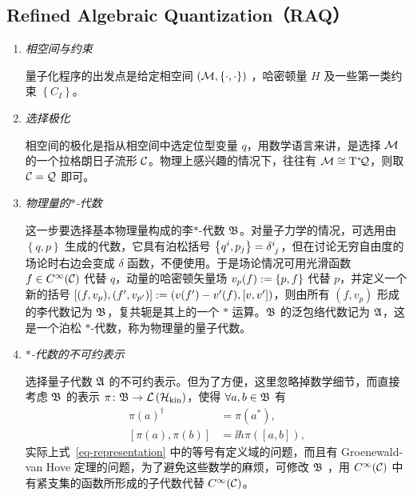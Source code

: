 		\subsection{Refined Algebraic Quantization（RAQ）}
		\begin{enumerate}
			\item \emph{相空间与约束}

					量子化程序的出发点是给定相空间 $\left( \mathcal{M}, \{\cdot, \cdot\} \right)$ ，哈密顿量 $H$ 及一些第一类约束 $\left\{ C_I \right\}$。

			\item \emph{选择极化}
			
					相空间的极化是指从相空间中选定位型变量 ${q}$，用数学语言来讲，是选择 $\mathcal{M}$ 的一个拉格朗日子流形 $\mathcal{C}$。物理上感兴趣的情况下，往往有 $\mathcal{M} \cong \mathrm{T}^*_{{}}\!{\mathcal{Q}}$，则取 $\mathcal{C} = \mathcal{Q}$ 即可。

			\item \emph{物理量的$*$-代数}
			
					这一步要选择基本物理量构成的李$*$-代数 $\mathfrak{B}$。对量子力学的情况，可选用由 $\left\{ {q}, {p} \right\}$ 生成的代数，它具有泊松括号 $ \left\{ q^i, p_j \right\} = \tensor{\delta}{^i_j}$，但在讨论无穷自由度的场论时右边会变成 $\delta$ 函数，不便使用。于是场论情况可用光滑函数 $f \in C^\infty(\mathcal{C})$ 代替 $q$，动量的哈密顿矢量场 $v_p(f) := \left\{ p, f \right\}$ 代替 $p$，并定义一个新的括号 $\left[ (f,v_p), \left( f',v_{p'} \right) \right] := \left( v(f') - v'(f), \left[ v,v' \right] \right)$，则由所有 $(f,v_p)$ 形成的李代数记为 $\mathfrak{B}$，复共轭是其上的一个 $*$ 运算。$\mathfrak{B}$ 的泛包络代数记为 $\mathfrak{A}$，这是一个泊松 $*$-代数，称为物理量的量子代数。

			\item \emph{$*$-代数的不可约表示}

					选择量子代数 $\mathfrak{A}$ 的不可约表示。但为了方便，这里忽略掉数学细节，而直接考虑 $\mathfrak{B}$ 的表示 $\pi \colon \mathfrak{B} \rightarrow \mathcal{L}\left( {\mathcal{H}_{\text{kin}}} \right)$，使得 $\forall a,b \in \mathfrak{B}$ 有
					\begin{equation}
						\begin{split}
							{\pi(a)}^\dagger &= \pi(a^*),\\
							\left[ \pi(a), \pi(b) \right] &= \ii \hbar \pi\left( \left[ a,b \right] \right),\label{eq-representation}
						\end{split}
					\end{equation}
					实际上式~\eqref{eq-representation} 中的等号有定义域的问题，而且有 Groenewald-van Hove 定理的问题，为了避免这些数学的麻烦，可修改 $\mathfrak{B}$ ，用 $C^\infty(\mathcal{C})$ 中有紧支集的函数所形成的子代数代替 $C^\infty(\mathcal{C})$。


\end{enumerate}
